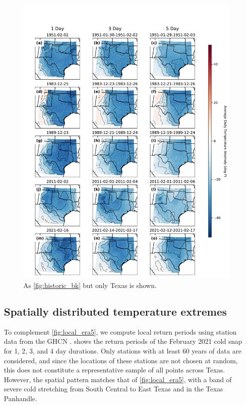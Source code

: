 \documentclass[12pt]{iopart}
\begin{document}
\begin{figure}
  \centering
  \includegraphics[width=\textwidth]{historic_events_era5_TX.pdf}
  \caption{
    As \cref{fig:historic_bk} but only Texas is shown.
  }\label{fig:historic_tx}
\end{figure}

\subsection{Spatially distributed temperature extremes}

To complement \cref{fig:local_era5}, we compute local return periods using station data from the GHCN \cite{Menne:2012hk}.
 shows the return periods of the February 2021 cold snap for 1, 2, 3, and 4 day durations.
Only stations with at least 60 years of data are considered, and since the locations of these stations are not chosen at random, this does not constitute a representative sample of all points across Texas.
However, the spatial pattern matches that of \cref{fig:local_era5}, with a band of severe cold stretching from South Central to East Texas and in the Texas Panhandle.
\end{document}
